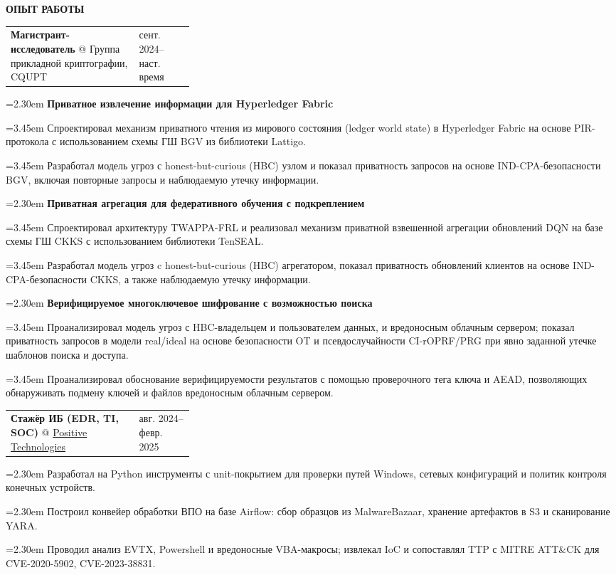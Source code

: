 \documentclass[11pt,a4paper]{article}
\makeatletter
\newcommand{\cvrow}[2]{%
  \noindent
  \begin{minipage}[t]{0.145\textwidth}
    \vspace{0pt}%
    \raggedright
    \fontsize{8.5}{10}\selectfont
    \bfseries\MakeUppercase{#1}
  \end{minipage}%
  \hfill
  \begin{minipage}[t]{0.835\textwidth}
    \vspace{0pt}%
    #2
  \end{minipage}\par
}
\newcommand{\workentry}[2]{%
  \noindent
  \begin{tabularx}{\linewidth}
    {@{}X@{\hspace{0.8em}}
    >{\raggedleft\arraybackslash}p{0.30\linewidth}@{}}
    #1 & \small #2
  \end{tabularx}\par
  \vspace{0.15em}
}
\newcommand{\workproject}[1]{%
  \noindent
  \hangindent=2.30em
  \hangafter=1
  \hspace*{1.15em}\makebox[1.15em][l]{$\diamond$}#1\par
  \vspace{0.12em}
}
\newcommand{\workprojectdetail}[1]{%
  \noindent
  \hangindent=3.45em
  \hangafter=1
  \hspace*{2.30em}\makebox[1.15em][l]{--}#1\par
  \vspace{0.08em}
}
\makeatother
\begin{document}
\vspace{0.50em}

\cvrow{Опыт работы}{%
  \workentry
    {\textbf{Магистрант-исследователь} @ Группа прикладной криптографии, CQUPT}
    {сент. 2024--наст. время}

  \workproject{\textbf{Приватное извлечение информации для Hyperledger Fabric}}
  \workprojectdetail{Спроектировал механизм приватного чтения из мирового состояния 
  (ledger world state) в Hyperledger Fabric на основе PIR-протокола с использованием схемы ГШ 
  BGV из библиотеки Lattigo.}
  \workprojectdetail{Разработал модель угроз с honest-but-curious (HBC) узлом
  и показал приватность запросов на основе IND-CPA-безопасности
  BGV, включая повторные запросы и наблюдаемую утечку информации.}

  \workproject{\textbf{Приватная агрегация для федеративного обучения с подкреплением}}
  \workprojectdetail{Спроектировал архитектуру TWAPPA-FRL и реализовал
  механизм приватной взвешенной агрегации обновлений DQN на базе схемы
  ГШ CKKS с использованием библиотеки TenSEAL.}
  \workprojectdetail{Разработал модель угроз c honest-but-curious (HBC) агрегатором, показал
  приватность обновлений клиентов на основе IND-CPA-безопасности CKKS, а также наблюдаемую 
  утечку информации.}

  \workproject{\textbf{Верифицируемое многоключевое шифрование с возможностью поиска}}
  \workprojectdetail{Проанализировал модель угроз с HBC-владельцем и пользователем данных,
  и вредоносным облачным сервером; показал приватность запросов в модели
  real/ideal на основе безопасности OT и псевдослучайности CI-rOPRF/PRG
  при явно заданной утечке шаблонов поиска и доступа.}
  \workprojectdetail{Проанализировал обоснование верифицируемости результатов с помощью
  проверочного тега ключа и AEAD, позволяющих обнаруживать подмену ключей
  и файлов вредоносным облачным сервером.}
}

\vspace{0.50em}

\cvrow{}{%
  \workentry
    {\textbf{Стажёр ИБ (EDR, TI, SOC)} @
    \href{https://global.ptsecurity.com/en/}{Positive Technologies}}
    {авг. 2024--февр. 2025}

  \workproject{Разработал на Python инструменты с unit-покрытием для
  проверки путей Windows, сетевых конфигураций и политик контроля конечных устройств.}
  \workproject{Построил конвейер обработки ВПО на базе Airflow:
  сбор образцов из MalwareBazaar, хранение артефактов в S3 и сканирование YARA.}
  \workproject{Проводил анализ EVTX, Powershell и вредоносные VBA-макросы;
  извлекал IoC и сопоставлял TTP с MITRE ATT\&CK для CVE-2020-5902, CVE-2023-38831.}
}
\end{document}
